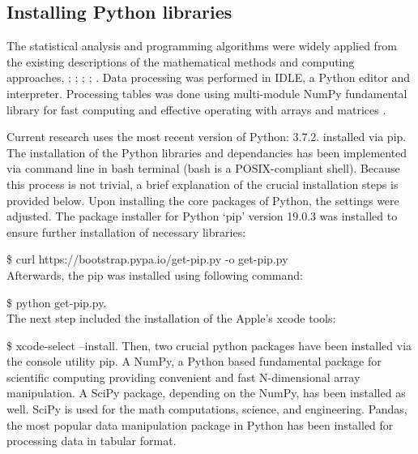 \documentclass[11pt,a4paper]{report}
\begin{document}
{%
\subsection{Installing Python libraries}\label{ssec:Py01}
The statistical analysis and programming algorithms were widely applied from the existing descriptions of the mathematical methods and computing approaches, \cite{Robertsetal2018}; \cite{Vermeeschetal2016}; \cite{Halterman2011}; \cite{Harrington2015}; \cite{Kuhlman2013}. Data processing was performed in \ac{IDLE}, a Python editor and interpreter. Processing tables was done using multi-module \ac{NumPy} fundamental library for fast computing and effective operating with arrays and matrices \cite{NumPyCommunity2019}. 

Current research uses the most recent version of Python: 3.7.2. installed via pip. The installation of the Python libraries and dependancies has been implemented via command line in \ac{bash} terminal (\ac{bash} is a \ac{POSIX}-compliant shell). Because this process is not trivial, a brief explanation of the crucial installation steps is provided below. Upon installing the core packages of Python, the settings were adjusted. The package installer for Python ‘pip’ version 19.0.3 was installed to ensure further installation of necessary libraries: 

\$ curl https://bootstrap.pypa.io/get-pip.py -o get-pip.py \\
Afterwards, the pip was installed using following command: 

\$ python get-pip.py. \\
The next step included the installation of the Apple’s xcode tools:  

\$ xcode-select –install. Then, two crucial python packages have been installed via the console utility pip. A \ac{NumPy}, a Python based fundamental package for scientific computing providing convenient and fast N-dimensional array manipulation. A \ac{SciPy} package, depending on the \ac{NumPy}, has been installed as well. \ac{SciPy} is used for the math computations, science, and engineering. Pandas, the most popular data manipulation package in Python has been installed for processing data in tabular format.

}
\end{document}
